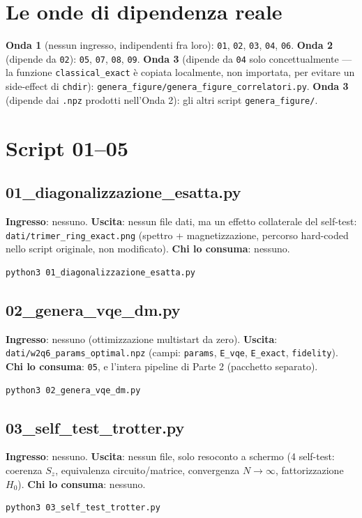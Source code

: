 \documentclass[11pt,a4paper]{article}
\begin{document}
\section{Le onde di dipendenza reale}

\textbf{Onda 1} (nessun ingresso, indipendenti fra loro): \texttt{01},
\texttt{02}, \texttt{03}, \texttt{04}, \texttt{06}. \textbf{Onda 2}
(dipende da \texttt{02}): \texttt{05}, \texttt{07}, \texttt{08},
\texttt{09}. \textbf{Onda 3} (dipende da \texttt{04} solo
concettualmente --- la funzione \texttt{classical\_exact} è copiata
localmente, non importata, per evitare un side-effect di \texttt{chdir}):
\texttt{genera\_figure/genera\_figure\_correlatori.py}. \textbf{Onda 3}
(dipende dai \texttt{.npz} prodotti nell'Onda 2): gli altri script
\texttt{genera\_figure/}.

\section{Script 01--05}

\subsection{01\_diagonalizzazione\_esatta.py}
\textbf{Ingresso}: nessuno. \textbf{Uscita}: nessun file dati, ma un
effetto collaterale del self-test: \texttt{dati/trimer\_ring\_exact.png}
(spettro + magnetizzazione, percorso hard-coded nello script originale,
non modificato). \textbf{Chi lo consuma}: nessuno.
\begin{verbatim}
python3 01_diagonalizzazione_esatta.py
\end{verbatim}

\subsection{02\_genera\_vqe\_dm.py}
\textbf{Ingresso}: nessuno (ottimizzazione multistart da zero).
\textbf{Uscita}: \texttt{dati/w2q6\_params\_optimal.npz} (campi:
\texttt{params}, \texttt{E\_vqe}, \texttt{E\_exact}, \texttt{fidelity}).
\textbf{Chi lo consuma}: \texttt{05}, e l'intera pipeline di Parte 2
(pacchetto separato).
\begin{verbatim}
python3 02_genera_vqe_dm.py
\end{verbatim}

\subsection{03\_self\_test\_trotter.py}
\textbf{Ingresso}: nessuno. \textbf{Uscita}: nessun file, solo resoconto
a schermo (4 self-test: coerenza $S_z$, equivalenza circuito/matrice,
convergenza $N\to\infty$, fattorizzazione $H_0$). \textbf{Chi lo
consuma}: nessuno.
\begin{verbatim}
python3 03_self_test_trotter.py
\end{verbatim}
\end{document}
